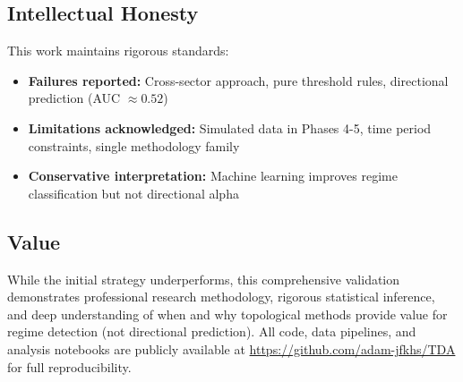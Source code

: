 \documentclass[12pt,letterpaper]{article}
\begin{document}
\subsection*{Intellectual Honesty}

This work maintains rigorous standards:
\begin{itemize}
    \item \textbf{Failures reported:} Cross-sector approach, pure threshold rules, directional prediction (AUC $\approx 0.52$)
    \item \textbf{Limitations acknowledged:} Simulated data in Phases 4-5, time period constraints, single methodology family
    \item \textbf{Conservative interpretation:} Machine learning improves regime classification but not directional alpha
\end{itemize}

\subsection*{Value}

While the initial strategy underperforms, this comprehensive validation demonstrates professional research methodology, rigorous statistical inference, and deep understanding of when and why topological methods provide value for regime detection (not directional prediction). All code, data pipelines, and analysis notebooks are publicly available at \url{https://github.com/adam-jfkhs/TDA} for full reproducibility.

\clearpage




\clearpage













\end{document}
